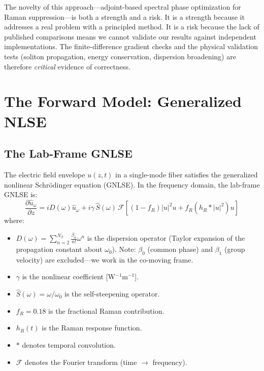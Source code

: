 \documentclass[12pt,a4paper]{article}
\newcommand{\pdv}[2]{\frac{\partial #1}{\partial #2}}
\theoremstyle{definition}
\begin{document}
\begin{advisory}
The novelty of this approach---adjoint-based spectral phase optimization for Raman suppression---is both a strength and a risk. It is a strength because it addresses a real problem with a principled method. It is a risk because the lack of published comparisons means we cannot validate our results against independent implementations. The finite-difference gradient checks and the physical validation tests (soliton propagation, energy conservation, dispersion broadening) are therefore \emph{critical} evidence of correctness.
\end{advisory}


\section{The Forward Model: Generalized NLSE}
\label{sec:forward}

\subsection{The Lab-Frame GNLSE}

The electric field envelope $u(z,t)$ in a single-mode fiber satisfies the generalized nonlinear Schr\"odinger equation (GNLSE). In the frequency domain, the lab-frame GNLSE is:
\begin{equation}
\pdv{\hat{u}_\omega}{z} = iD(\omega)\hat{u}_\omega + i\gamma\,\hat{S}(\omega)\,\mathcal{F}\!\left[\left(1-f_R\right)|u|^2 u + f_R\left(h_R * |u|^2\right)u\right]
\label{eq:gnlse_lab}
\end{equation}
where:
\begin{itemize}[leftmargin=*]
\item $D(\omega) = \sum_{n=2}^{N_\beta} \frac{\beta_n}{n!}\omega^n$ is the dispersion operator (Taylor expansion of the propagation constant about $\omega_0$). Note: $\beta_0$ (common phase) and $\beta_1$ (group velocity) are excluded---we work in the co-moving frame.
\item $\gamma$ is the nonlinear coefficient [W$^{-1}$m$^{-1}$].
\item $\hat{S}(\omega) = \omega/\omega_0$ is the self-steepening operator.
\item $f_R = 0.18$ is the fractional Raman contribution.
\item $h_R(t)$ is the Raman response function.
\item $*$ denotes temporal convolution.
\item $\mathcal{F}$ denotes the Fourier transform (time $\to$ frequency).
\end{itemize}
\end{document}

